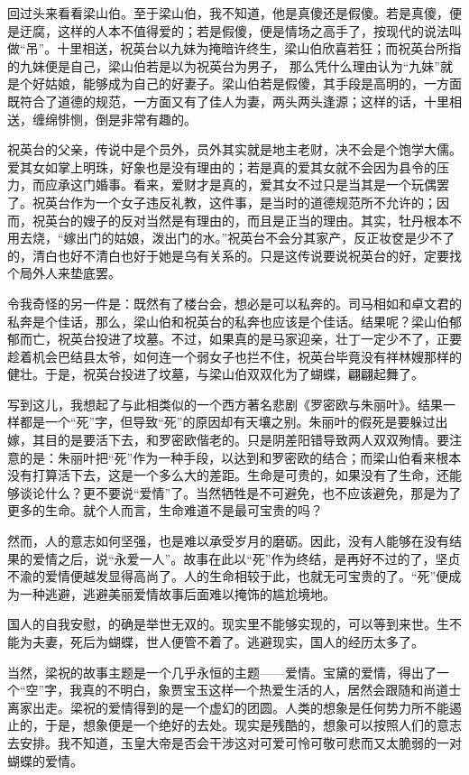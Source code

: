 回过头来看看梁山伯。至于梁山伯，我不知道，他是真傻还是假傻。若是真傻，便是迂腐，这样的人本不值得爱的；若是假傻，便是情场之高手了，按现代的说法叫做“吊”。十里相送，祝英台以九妹为掩暗许终生，梁山伯欣喜若狂；而祝英台所指的九妹便是自己，梁山伯若是以为祝英台为男子， 那么凭什么理由认为“九妹”就是个好姑娘，能够成为自己的好妻子。梁山伯若是假傻，其手段是高明的，一方面既符合了道德的规范，一方面又有了佳人为妻，两头两头逢源；这样的话，十里相送，缠绵悱恻，倒是非常有趣的。

祝英台的父亲，传说中是个员外，员外其实就是地主老财，决不会是个饱学大儒。爱其女如掌上明珠，好象也是没有理由的；若是真的爱其女就不会因为县令的压力，而应承这门婚事。看来，爱财才是真的，爱其女不过只是当其是一个玩偶罢了。祝英台作为一个女子违反礼教，这件事，是当时的道德规范所不允许的；因而，祝英台的嫂子的反对当然是有理由的，而且是正当的理由。其实，牡丹根本不用去烧，“嫁出门的姑娘，泼出门的水。”祝英台不会分其家产，反正妆奁是少不了的，清白也好不清白也好于她是乌有关系的。只是这传说要说祝英台的好，定要找个局外人来垫底罢。

令我奇怪的另一件是：既然有了楼台会，想必是可以私奔的。司马相如和卓文君的私奔是个佳话，那么，梁山伯和祝英台的私奔也应该是个佳话。结果呢？梁山伯郁郁而亡，祝英台投进了坟墓。不过，如果真的是马家迎亲，壮丁一定少不了，正要趁着机会巴结县太爷，如何连一个弱女子也拦不住，祝英台毕竟没有祥林嫂那样的健壮。于是，祝英台投进了坟墓，与梁山伯双双化为了蝴蝶，翩翩起舞了。

写到这儿，我想起了与此相类似的一个西方著名悲剧《罗密欧与朱丽叶》。结果一样都是一个“死”字，但导致“死”的原因却有天壤之别。朱丽叶的假死是要躲过出嫁，其目的是要活下去，和罗密欧偕老的。只是阴差阳错导致两人双双殉情。要注意的是：朱丽叶把“死”作为一种手段，以达到和罗密欧的结合；而梁山伯看来根本没有打算活下去，这是一个多么大的差距。生命是可贵的，如果没有了生命，还能够谈论什么？更不要说“爱情”了。当然牺牲是不可避免，也不应该避免，那是为了更多的生命。就个人而言，生命难道不是最可宝贵的吗？

然而，人的意志如何坚强，也是难以承受岁月的磨砺。因此，没有人能够在没有结果的爱情之后，说“永爱一人”。故事在此以“死”作为终结，是再好不过的了，坚贞不渝的爱情便越发显得高尚了。人的生命相较于此，也就无可宝贵的了。“死”便成为一种逃避，逃避美丽爱情故事后面难以掩饰的尴尬境地。

国人的自我安慰，的确是举世无双的。现实里不能够实现的，可以等到来世。生不能为夫妻，死后为蝴蝶，世人便管不着了。逃避现实，国人的经历太多了。

当然，梁祝的故事主题是一个几乎永恒的主题——爱情。宝黛的爱情，得出了一个“空”字，我真的不明白，象贾宝玉这样一个热爱生活的人，居然会跟随和尚道士离家出走。梁祝的爱情得到的是一个虚幻的团圆。人类的想象是任何势力所不能遏止的，于是，想象便是一个绝好的去处。现实是残酷的，想象可以按照人们的意志去安排。我不知道，玉皇大帝是否会干涉这对可爱可怜可敬可悲而又太脆弱的一对蝴蝶的爱情。

